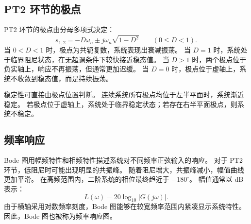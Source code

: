 \subsection{PT2 环节的极点}

PT2 环节的极点由分母多项式决定：
\[
  s_{1,2} = -D\omega_n \pm j\omega_n\sqrt{1-D^2}
  \qquad (0 \leq D < 1).
\]
当 $0 < D < 1$ 时，极点为共轭复数，系统表现出衰减振荡。
当 $D = 1$ 时，系统处于临界阻尼状态，在无超调条件下较快接近稳态值。
当 $D > 1$ 时，两个极点位于负实轴上，响应不再振荡，但通常更加迟缓。
当 $D = 0$ 时，极点位于虚轴上，系统不收敛到稳态值，而是持续振荡。

稳定性可直接由极点位置判断。
连续系统所有极点均位于左半平面时，系统渐近稳定。
若极点位于虚轴上，系统处于临界稳定状态；若存在右半平面极点，则系统不稳定。

\subsection{频率响应}

Bode 图用幅频特性和相频特性描述系统对不同频率正弦输入的响应。
对于 PT2 环节，低阻尼时可能出现明显的共振峰。
随着阻尼增大，共振峰减小，幅值曲线更加平滑。
在高频范围内，二阶系统的相位最终趋近于 $-180^\circ$。
幅值通常以 dB 表示：
\[
  L(\omega) = 20\log_{10}|G(j\omega)|.
\]
由于横轴采用对数频率刻度，Bode 图能够在较宽频率范围内紧凑显示系统特性。
因此，Bode 图也被称为频率响应图。

